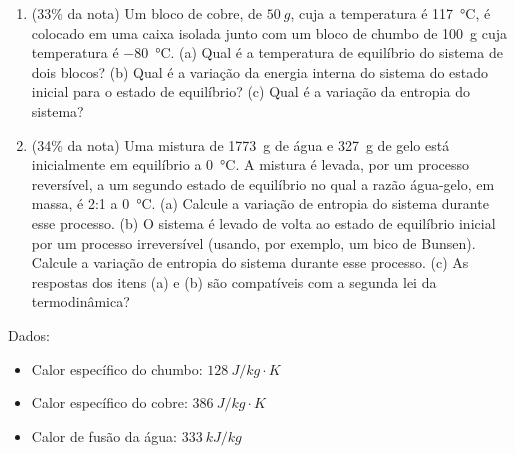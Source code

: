 \documentclass[12pt,a4paper,brazilian, fleqn]{article}
\newcommand{\ratio}[1]{(#1\% da nota)}
\def\Description{Física Geral II -- Prova 3}
\begin{document}
\begin{enumerate}
    \item \ratio{33} Um bloco de cobre, de \(\SI{50}{g}\), cuja a temperatura é 
        \SI{117}{\celsius}, é colocado em uma caixa isolada junto com um bloco de chumbo de 
        \SI{100}{g} cuja temperatura é \SI{-80}{\celsius}. (a) Qual é a temperatura de equilíbrio
        do sistema de dois blocos? (b) Qual é a variação da energia interna do sistema 
        do estado inicial para o estado de equilíbrio? (c) Qual é a variação da 
        entropia do sistema?

    \item \ratio{34} Uma mistura de \SI{1773}{g} de água e \SI{327}{g} de gelo
        está inicialmente em equilíbrio a \SI{0}{\celsius}. A mistura é levada,
        por um processo reversível, a um segundo estado de equilíbrio no qual a 
        razão água-gelo, em massa, é 2:1 a \SI{0}{\celsius}. (a) Calcule a variação 
        de entropia do sistema durante esse processo. (b) O sistema é levado de volta
        ao estado de equilíbrio inicial por um processo irreversível (usando, por
        exemplo, um bico de Bunsen). Calcule a variação de entropia do sistema durante
        esse processo. (c) As respostas dos itens (a) e (b) são compatíveis com a 
        segunda lei da termodinâmica?

\end{enumerate}

Dados:
\begin{itemize}
    \item Calor específico do chumbo: \(\SI{128}{J/kg\cdot K}\)
    \item Calor específico do cobre: \(\SI{386}{J/kg\cdot K}\)
    \item Calor de fusão da água: \(\SI{333}{kJ/kg}\)
\end{itemize}

\newpage
\def\Description{Física Geral II -- Prova 3}
\end{document}
